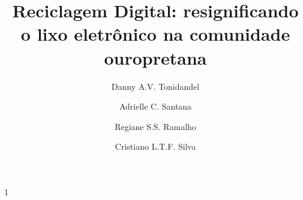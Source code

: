 \documentclass[a4paper]{ifacconf}
\def\portugues{1}
\def\portugues{0}
\begin{document}
	
	
\if\portugues1

% 
	
\begin{frontmatter}

\title{Reciclagem Digital: resignificando o lixo eletrônico na comunidade ouropretana}

\author[1]{Danny A.V. Tonidandel}
\author[1]{Adrielle C. Santana}
\author[1]{Regiane S.S. Ramalho}
\author[2]{Cristiano L.T.F. Silva}

\address[1]{Universidade Federal de Ouro Preto (UFOP)\\ Departamento de Eng. de Controle $\&$ Automação \\ Ouro Preto, MG, Brasil, (e-mails: tonidandel@ufop.edu.br, adrielle@ufop.edu.br, regiane@ufop.edu.br).}

\address[2]{Universidade Federal de Ouro Preto\\ Departamento de Eng. de Produção \\ Ouro Preto, MG, Brasil, (e-mail: cristiano.silva@ufop.edu.br)}



\end{frontmatter}
\end{document}
